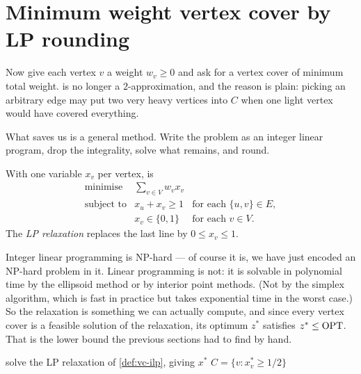 \section{Minimum weight vertex cover by LP rounding}
\label{sec:lp-rounding}

Now give each vertex $v$ a weight $w_v \ge 0$ and ask for a vertex cover of
minimum total weight.  is no longer a $2$-approximation,
and the reason is plain: picking an arbitrary edge may put two very heavy
vertices into $C$ when one light vertex would have covered everything.

What saves us is a general method. Write the problem as an integer linear
program, drop the integrality, solve what remains, and round.

\begin{definition}\label{def:vc-ilp}
With one variable $x_v$ per vertex,  is
\[
\begin{array}{lll}
  \text{minimise}   & \displaystyle\sum_{v \in V} w_v x_v & \\[2pt]
  \text{subject to} & x_u + x_v \ge 1 & \text{for each } \{u,v\} \in E, \\[2pt]
                    & x_v \in \{0,1\} & \text{for each } v \in V.
\end{array}
\]
The \emph{LP relaxation} replaces the last line by $0 \le x_v \le 1$.
\end{definition}

Integer linear programming is \textrm{NP}-hard --- of course it is, we have
just encoded an \textrm{NP}-hard problem in it. Linear programming is not: it
is solvable in polynomial time by the ellipsoid method or by interior point
methods. (Not by the simplex algorithm, which is fast in practice but takes
exponential time in the worst case.) So the relaxation is something we can
actually compute, and since every vertex cover is a feasible solution of the
relaxation, its optimum $z^{*}$ satisfies $z^{*} \le \mathrm{OPT}$. That is the lower
bound the previous sections had to find by hand.

\begin{algorithm}[ht]
\caption{LP rounding for }
\label{alg:vc-lp-rounding}
\begin{algorithmic}[1]
  \State solve the LP relaxation of \cref{def:vc-ilp}, giving $x^{*}$
  \State \Return $C = \{v : x^{*}_v \ge 1/2\}$
\end{algorithmic}
\end{algorithm}

